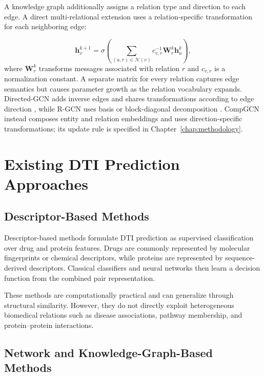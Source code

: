 A knowledge graph additionally assigns a relation type and direction to each
edge. A direct multi-relational extension uses a relation-specific
transformation for each neighboring edge:

\begin{equation}
    \mathbf{h}_{v}^{k+1}
    =
    \sigma
    \left(
        \sum_{(u,r)\in\mathcal{N}(v)}
        c_{v,r}^{-1}\mathbf{W}_{r}^{k}\mathbf{h}_{u}^{k}
    \right),
    \label{eq:background_relational_gcn_update}
\end{equation}
where $\mathbf{W}_{r}^{k}$ transforms messages associated with relation $r$
and $c_{v,r}$ is a normalization constant. A separate matrix for every
relation captures edge semantics but causes parameter growth as the relation
vocabulary expands. Directed-GCN adds inverse edges and shares transformations
according to edge direction \cite{marcheggiani2017encoding}, while R-GCN uses
basis or block-diagonal decomposition \cite{schlichtkrull2018modeling}.
CompGCN instead composes entity and relation embeddings and uses
direction-specific transformations; its update rule is specified in
Chapter~\ref{chap:methodology}.

\section{Existing DTI Prediction Approaches}

\subsection{Descriptor-Based Methods}

Descriptor-based methods formulate DTI prediction as supervised classification
over drug and protein features. Drugs are commonly represented by molecular
fingerprints or chemical descriptors, while proteins are represented by
sequence-derived descriptors. Classical classifiers and neural networks then
learn a decision function from the combined pair representation.

These methods are computationally practical and can generalize through
structural similarity. However, they do not directly exploit heterogeneous
biomedical relations such as disease associations, pathway membership, and
protein--protein interactions.

\subsection{Network and Knowledge-Graph-Based Methods}

